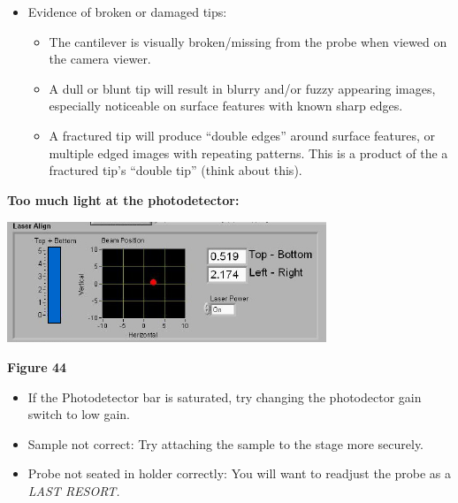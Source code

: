 \documentclass{../lab}
\begin{document}
{\begin{itemize}
\begin{itemize}
    \end{itemize}

    \item Evidence of broken or damaged tips:

    \begin{itemize}
        \item The cantilever is visually broken/missing from the probe when viewed on the camera viewer.

        \item A dull or blunt tip will result in blurry and/or fuzzy appearing images, especially noticeable on surface features with known sharp edges.

        \item A fractured tip will produce ``double edges'' around surface features, or multiple edged images with repeating patterns.  This is a product of the a fractured tip's ``double tip'' (think about this).

    \end{itemize}

\end{itemize}

\textbf{Too much light at the photodetector:}


\begin{center}
    \href{http://experimentationlab.berkeley.edu/sites/default/files/AFMImages/53.png}{\includegraphics[width=0.5\linewidth]{images/53.png}}
\end{center}

\textbf{Figure 44}

\begin{itemize}
    \item If the Photodetector bar is saturated, try changing the photodector gain switch to low gain.

\end{itemize}

\begin{itemize}
    \item Sample not correct:  Try attaching the sample to the stage more securely.

    \item Probe not seated in holder correctly:  You will want to readjust the probe as a \emph{LAST RESORT.}


\end{itemize}}
\end{document}
